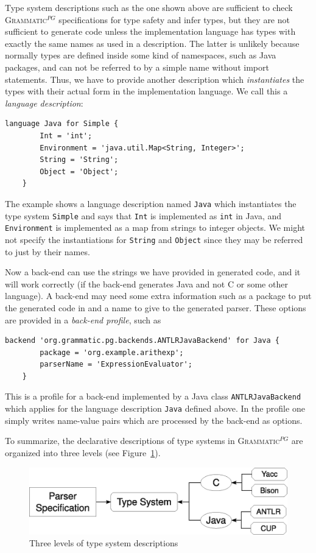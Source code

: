 \documentclass{llncs2e/llncs}
\newcommand{\figref}[1]{Figure~\ref{#1}}
\newcommand{\ATF}{\textsc{Grammatic}$^{PG}$}
\begin{document}
Type system descriptions such as the one shown above are sufficient to check \ATF{} specifications for type safety and infer types, but they are not sufficient to generate code unless the implementation language has types with exactly the same names as used in a description. The latter is unlikely because normally types are defined inside some kind of namespaces, such as Java packages, and can not be referred to by a simple name without import statements. Thus, we have to provide another description which \emph{instantiates} the types with their actual form in the implementation language. We call this a \emph{language description}:
\begin{lstlisting}[language=Typesystem]
	language Java for Simple {
		Int = 'int';
		Environment = 'java.util.Map<String, Integer>';
		String = 'String';
		Object = 'Object';
	}
\end{lstlisting}
The example shows a language description named \texttt{Java} which instantiates the type system \texttt{Simple} and says that \texttt{Int} is implemented as \texttt{int} in Java, and \texttt{Environment} is implemented as a map from strings to integer objects. We might not specify the instantiations for \texttt{String} and \texttt{Object} since they may be referred to just by their names.

Now a back-end can use the strings we have provided in generated code, and it will work correctly (if the back-end generates Java and not C or some other language). A back-end may need some extra information such as a package to put the generated code in and a name to give to the generated parser. These options are provided in a \emph{back-end profile}, such as
\begin{lstlisting}[language=Typesystem]
	backend 'org.grammatic.pg.backends.ANTLRJavaBackend' for Java {
		package = 'org.example.arithexp';
		parserName = 'ExpressionEvaluator';
	}
\end{lstlisting}

This is a profile for a back-end implemented by a Java class \texttt{ANTLRJavaBackend} which applies for the language description \texttt{Java} defined above. In the profile one simply writes name-value pairs which are processed by the back-end as options.

To summarize, the declarative descriptions of type systems in \ATF{} are organized into three levels (see \figref{typesystem}). 

\begin{figure}[htbp]
\center
		\includegraphics[width=.7\textwidth]{typesystem}
		\caption{Three levels of type system descriptions}\label{typesystem}
\end{figure}
\end{document}
